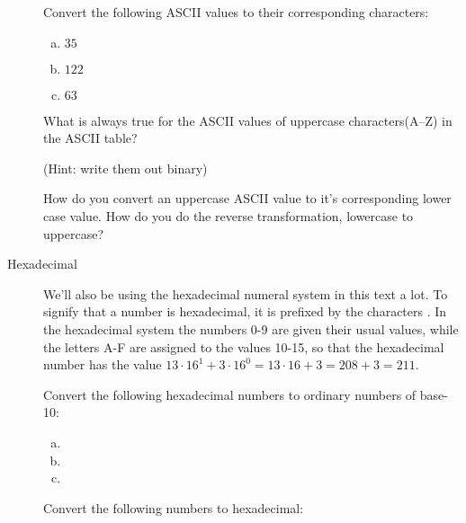 \begin{description}
  \begin{Exercise}[label={num-to-ascii}]
    Convert the following ASCII values to their corresponding characters:
    \begin{enumerate}[(a)]
    \item $35$
    \item $122$
    \item $63$
    \end{enumerate}
  \end{Exercise}

  \begin{Exercise}[label={ascii-uppercase}]

    What is always true for the ASCII values of uppercase characters(A--Z)
    in the ASCII table?

    (Hint: write them out binary)

  \end{Exercise}

  \begin{Exercise}[label={uppercase-conv}]

    How do you convert an uppercase ASCII value to it's corresponding
    lower case value. How do you do the reverse transformation,
    lowercase to uppercase?

  \end{Exercise}

\item[Hexadecimal] We'll also be using the hexadecimal numeral system
  in this text a lot. To signify that a number is hexadecimal, it is
  prefixed by the characters \hex{}. In the hexadecimal system the
  numbers 0-9 are given their usual values, while the letters A-F are
  assigned to the values 10-15, so that the hexadecimal number
   has the value $13 \cdot 16^1 + 3 \cdot 16^0 = 13 \cdot 16 +
  3 = 208 + 3 = 211$.

  \begin{Exercise}[label={hex-to-n}]
    Convert the following hexadecimal numbers to ordinary numbers of
    base-10:

    \begin{enumerate}[(a)]
    \item {}
    \item {}
    \item {}
    \end{enumerate}

  \end{Exercise}

  \begin{Exercise}[label={n-to-hex}]
    Convert the following numbers to hexadecimal:


\end{Exercise}
\end{description}
